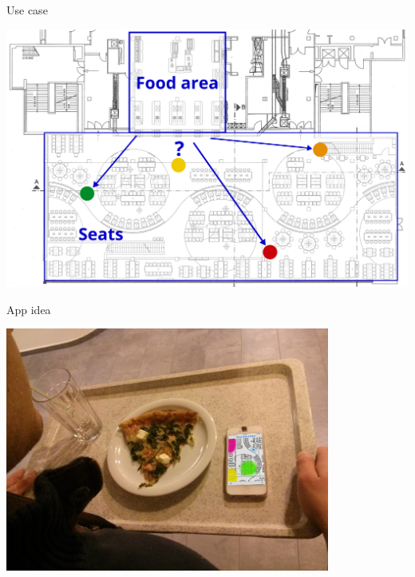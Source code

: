 \documentclass[11pt]{beamer}
\begin{document}
\begin{frame}{Use case}

	\begin{center}

        \includegraphics[width=\textwidth]{mensa-floor-plan-people-moving}

    \end{center}

\end{frame}

\begin{frame}{App idea}

    \begin{center}

        \vspace*{-14pt}\includegraphics[width=0.8\textwidth]{navitablet}

    \end{center}

\end{frame}
\end{document}

